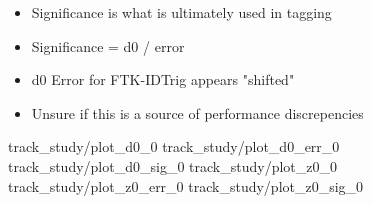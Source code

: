     { \begin{itemize}
        \item Significance is what is ultimately used in tagging
        \item Significance = d0 / error
        \item d0 Error for FTK-IDTrig appears "shifted"
        \item Unsure if this is a source of performance discrepencies
    \end{itemize} }
    {track_study/plot_d0_0}
    {track_study/plot_d0_err_0}
    {track_study/plot_d0_sig_0}
    {track_study/plot_z0_0}
    {track_study/plot_z0_err_0}
    {track_study/plot_z0_sig_0}
